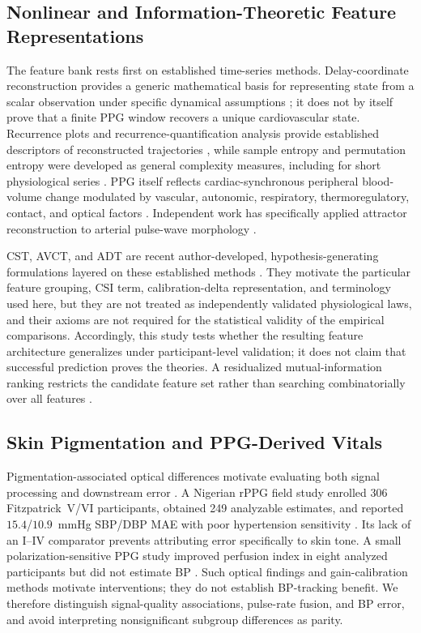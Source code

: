 \documentclass[journal]{IEEEtran}
\begin{document}
\subsection{Nonlinear and Information-Theoretic Feature Representations}
The feature bank rests first on established time-series methods. Delay-coordinate reconstruction provides a generic mathematical basis for representing state from a scalar observation under specific dynamical assumptions \cite{takens1981}; it does not by itself prove that a finite PPG window recovers a unique cardiovascular state. Recurrence plots and recurrence-quantification analysis provide established descriptors of reconstructed trajectories \cite{eckmann1987,marwan2007}, while sample entropy and permutation entropy were developed as general complexity measures, including for short physiological series \cite{richman2000,bandt2002}. PPG itself reflects cardiac-synchronous peripheral blood-volume change modulated by vascular, autonomic, respiratory, thermoregulatory, contact, and optical factors \cite{allen2007ppg}. Independent work has specifically applied attractor reconstruction to arterial pulse-wave morphology \cite{attractorpulse2022}.

CST, AVCT, and ADT are recent author-developed, hypothesis-generating formulations layered on these established methods \cite{cst2026,avct2026,adt2026}. They motivate the particular feature grouping, CSI term, calibration-delta representation, and terminology used here, but they are not treated as independently validated physiological laws, and their axioms are not required for the statistical validity of the empirical comparisons. Accordingly, this study tests whether the resulting feature architecture generalizes under participant-level validation; it does not claim that successful prediction proves the theories. A residualized mutual-information ranking restricts the candidate feature set rather than searching combinatorially over all features \cite{shannon1948,cover2006}.
\subsection{Skin Pigmentation and PPG-Derived Vitals}
Pigmentation-associated optical differences motivate evaluating both signal processing and downstream error \cite{jmir2024,fitzpatrick2024,phantom2026,montecarlo2026,polarimetric2026}. A Nigerian rPPG field study enrolled 306 Fitzpatrick~V/VI participants, obtained 249 analyzable estimates, and reported $15.4$/$10.9$~mmHg SBP/DBP MAE with poor hypertension sensitivity \cite{equity2026}. Its lack of an I--IV comparator prevents attributing error specifically to skin tone. A small polarization-sensitive PPG study improved perfusion index in eight analyzed participants but did not estimate BP \cite{polarimetric2026}. Such optical findings and gain-calibration methods \cite{gaincorrection2025} motivate interventions; they do not establish BP-tracking benefit. We therefore distinguish signal-quality associations, pulse-rate fusion, and BP error, and avoid interpreting nonsignificant subgroup differences as parity.
\end{document}
